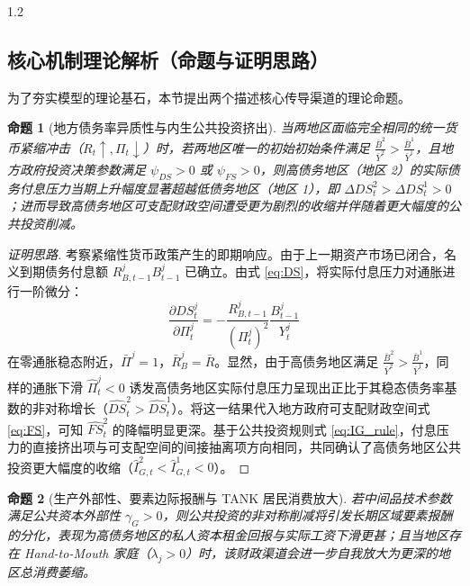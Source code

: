 \documentclass[12pt,UTF8]{ctexart}
\newtheorem{proposition}{命题}
\begin{document}
\begin{spacing}{1.2}
		\subsection{核心机制理论解析（命题与证明思路）}
		
		为了夯实模型的理论基石，本节提出两个描述核心传导渠道的理论命题。
		
		\begin{proposition}[地方债务率异质性与内生公共投资挤出] \label{prop1}
			当两地区面临完全相同的统一货币紧缩冲击（$R_t \uparrow, \Pi_t \downarrow$）时，若两地区唯一的初始初始条件满足 $\frac{\bar B^2}{\bar Y^2} > \frac{\bar B^1}{\bar Y^1}$，且地方政府投资决策参数满足 $\psi_{DS}>0$ 或 $\psi_{FS}>0$，则高债务地区（地区 2）的实际债务付息压力当期上升幅度显著超越低债务地区（地区 1），即 $\Delta DS_t^2 > \Delta DS_t^1 > 0$；进而导致高债务地区可支配财政空间遭受更为剧烈的收缩并伴随着更大幅度的公共投资削减。
		\end{proposition}
		
		\begin{proof}[证明思路]
			考察紧缩性货币政策产生的即期响应。由于上一期资产市场已闭合，名义到期债务付息额 $R_{B,t-1}^j B_{t-1}^j$ 已确立。由式 \eqref{eq:DS}，将实际付息压力对通胀进行一阶微分：
			\begin{equation}
				\frac{\partial DS_t^j}{\partial \Pi_t^j} = - \frac{R_{B,t-1}^j}{\left(\Pi_t^j\right)^2}\frac{B_{t-1}^j}{Y_t^j}
			\end{equation}
			在零通胀稳态附近，$\bar\Pi^j=1$，$\bar R_B^j = \bar R$。显然，由于高债务地区满足 $\frac{\bar B^2}{\bar Y^2} > \frac{\bar B^1}{\bar Y^1}$，同样的通胀下滑 $\hat{\Pi}_t^j < 0$ 诱发高债务地区实际付息压力呈现出正比于其稳态债务率基数的非对称增长（$\widehat{DS}_t^2 > \widehat{DS}_t^1$）。将这一结果代入地方政府可支配财政空间式 \eqref{eq:FS}，可知 $\widehat{FS}_t^2$ 的降幅明显更深。基于公共投资规则式 \eqref{eq:IG_rule}，付息压力的直接挤出项与可支配空间的间接抽离项方向相同，共同确认了高债务地区公共投资更大幅度的收缩（$\hat{I}_{G,t}^2 < \hat{I}_{G,t}^1 < 0$）。
		\end{proof}
		
		\begin{proposition}[生产外部性、要素边际报酬与 TANK 居民消费放大] \label{prop2}
			若中间品技术参数满足公共资本外部性 $\gamma_G > 0$，则公共投资的非对称削减将引发长期区域要素报酬的分化，表现为高债务地区的私人资本租金回报与实际工资下滑更甚；且当地区存在 Hand-to-Mouth 家庭（$\lambda_j > 0$）时，该财政渠道会进一步自我放大为更深的地区总消费萎缩。
		\end{proposition}
		

\end{spacing}
\end{document}
